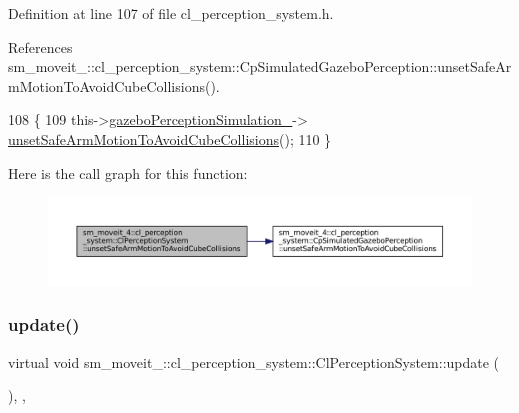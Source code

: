Definition at line 107 of file cl\+\_\+perception\+\_\+system.\+h.



References sm\+\_\+moveit\+\_\+::cl\+\_\+perception\+\_\+system\+::\+Cp\+Simulated\+Gazebo\+Perception\+::unset\+Safe\+Arm\+Motion\+To\+Avoid\+Cube\+Collisions().


\begin{DoxyCode}
108             \{
109                 this->\hyperlink{classsm__moveit__4_1_1cl__perception__system_1_1ClPerceptionSystem_a027c07df3f1a2cc0c30be111b27dbe5c}{gazeboPerceptionSimulation\_}->
      \hyperlink{classsm__moveit__4_1_1cl__perception__system_1_1CpSimulatedGazeboPerception_a7f5d68f2ff7dd0ade9756058e790efa1}{unsetSafeArmMotionToAvoidCubeCollisions}();
110             \}
\end{DoxyCode}
Here is the call graph for this function\+:
\nopagebreak
\begin{figure}[H]
\begin{center}
\leavevmode
\includegraphics[width=350pt]{classsm__moveit__4_1_1cl__perception__system_1_1ClPerceptionSystem_ab8bbe4be37d763fde0e67e9edd33b83a_cgraph}
\end{center}
\end{figure}
\mbox{\label{classsm__moveit__4_1_1cl__perception__system_1_1ClPerceptionSystem_a91de8cf71c93738f8bcbea388c84a5dd}} 
\subsubsection{\texorpdfstring{update()}{update()}}
{\footnotesize\ttfamily virtual void sm\+\_\+moveit\+\_\+::cl\+\_\+perception\+\_\+system\+::\+Cl\+Perception\+System\+::update (\begin{DoxyParamCaption}{ }\end{DoxyParamCaption})\hspace{0.3cm}{\ttfamily [inline]}, {\ttfamily [override]}, {\ttfamily [virtual]}}



